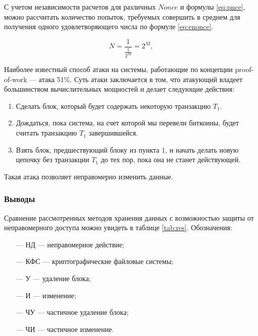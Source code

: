 С учетом независимости расчетов для различных $Nonce$ и формулы \ref{eq:pnce}, можно рассчитать количество попыток, требуемых совершить в среднем для получения одного удовлетворяющего числа по формуле \ref{eq:enonce}.

\begin{equation}
\label{eq:enonce}
N = \frac{1}{\frac{1}{2^M}} = 2^M,
\end{equation}

Наиболее известный способ атаки на системы, работающие по концепции proof-of-work --- атака 51\%. Суть атаки заключается в том, что атакующий владеет большинством вычислительных мощностей и делает следующие действия:
\begin{enumerate}
	\item Сделать блок, который будет содержать некоторую транзакцию $T_1$.
	\item Дождаться, пока система, на счет которой мы перевели биткоины, будет считать транзакцию $T_1$ завершившейся.
	\item Взять блок, предшествующий блоку из пункта 1, и начать делать новую цепочку без транзакции $T_1$ до тех пор, пока она не станет действующей.
\end{enumerate}

Такая атака позволяет неправомерно изменить данные.

\pagebreak

\subsubsection*{Выводы}


Сравнение рассмотренных методов хранения данных с возможностью защиты от неправомерного доступа можно увидеть в таблице \ref{tab:res}. Обозначения:
\begin{itemize}
    \item[---] НД --- неправомерное действие;
    \item[---] КФС --- криптографические файловые системы;
    \item[---] У --- удаление блока;
    \item[---] И --- изменение;
    \item[---] ЧУ --- частичное удаление блока;
    \item[---] ЧИ --- частичное изменение.
\end{itemize}

